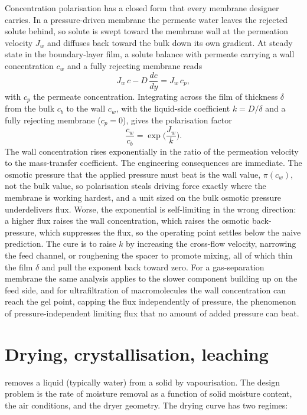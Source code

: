 

\begin{mastery}
Concentration polarisation has a closed form that every membrane
designer carries. In a pressure-driven membrane the permeate water
leaves the rejected solute behind, so solute is swept toward the
membrane wall at the permeation velocity $J_w$ and diffuses back toward
the bulk down its own gradient. At steady state in the boundary-layer
film, a solute balance with permeate carrying a wall concentration
$c_w$ and a fully rejecting membrane reads
\[
J_w\,c - D\,\frac{dc}{dy} = J_w\,c_p,
\]
with $c_p$ the permeate concentration. Integrating across the film of
thickness $\delta$ from the bulk $c_b$ to the wall $c_w$, with the
liquid-side coefficient $k = D/\delta$ and a fully rejecting membrane
($c_p = 0$), gives the polarisation factor
\[
\frac{c_w}{c_b} = \exp\!\Big(\frac{J_w}{k}\Big).
\]
The wall concentration rises exponentially in the ratio of the
permeation velocity to the mass-transfer coefficient. The engineering
consequences are immediate. The osmotic pressure that the applied
pressure must beat is the wall value, $\pi(c_w)$, not the bulk value, so
polarisation steals driving force exactly where the membrane is working
hardest, and a unit sized on the bulk osmotic pressure underdelivers
flux. Worse, the exponential is self-limiting in the wrong direction: a
higher flux raises the wall concentration, which raises the osmotic
back-pressure, which suppresses the flux, so the operating point settles
below the naive prediction. The cure is to raise $k$ by increasing the
cross-flow velocity, narrowing the feed channel, or roughening the
spacer to promote mixing, all of which thin the film $\delta$ and pull
the exponent back toward zero. For a gas-separation membrane the same
analysis applies to the slower component building up on the feed side,
and for ultrafiltration of macromolecules the wall concentration can
reach the gel point, capping the flux independently of pressure, the
phenomenon of pressure-independent limiting flux that no amount of added
pressure can beat.
\end{mastery}

\section{Drying, crystallisation, leaching}

 removes a liquid (typically water) from a solid by
vapourisation. The design problem is the rate of moisture removal as
a function of solid moisture content, the air conditions, and the
dryer geometry. The drying curve has two regimes:

